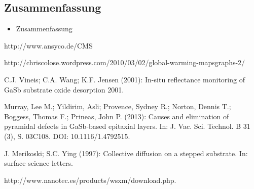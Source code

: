 \documentclass[paper=a4,fontsize=10pt,DIV=18,twocolumn,parskip=half]{scrartcl}
\numberwithin{equation}{section}    %
\begin{document}

\subsection{Zusammenfassung}
\begin{itemize}
\item Zusammenfassung
\end{itemize}

\begin{thebibliography}{}   

 http://www.ansyco.de/CMS

http://chriscolose.wordpress.com/2010/03/02/global-warming-mapsgraphs-2/

 C.J. Vineis; C.A. Wang; K.F. Jensen (2001): In-situ reflectance 
monitoring of GaSb substrate oxide desorption 2001.

 Murray, Lee M.; Yildirim, Asli; Provence, Sydney R.; Norton, 
Dennis T.; Boggess, Thomas F.; Prineas, John P. (2013): Causes and elimination 
of pyramidal defects in GaSb-based epitaxial layers. In: J. Vac. Sci. Technol. B 
31 (3), S. 03C108. DOI: 10.1116/1.4792515.
  
 J. Merikoski; S.C. Ying (1997): Collective diffusion on a 
stepped substrate. In: surface science letters.

 http://www.nanotec.es/products/wsxm/download.php. 
\end{thebibliography}
\end{document}
